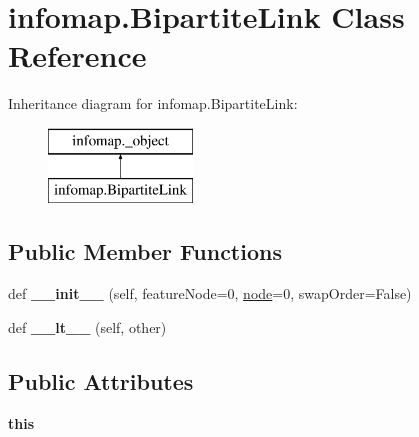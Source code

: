 \hypertarget{classinfomap_1_1BipartiteLink}{}\section{infomap.\+Bipartite\+Link Class Reference}
\label{classinfomap_1_1BipartiteLink}
Inheritance diagram for infomap.\+Bipartite\+Link\+:\begin{figure}[H]
\begin{center}
\leavevmode
\includegraphics[height=2.000000cm]{classinfomap_1_1BipartiteLink}
\end{center}
\end{figure}
\subsection*{Public Member Functions}
\begin{DoxyCompactItemize}
\item 
\mbox{\label{classinfomap_1_1BipartiteLink_a2b8a8dd8db074306c98379ef5d81345d}} 
def {\bfseries \+\_\+\+\_\+init\+\_\+\+\_\+} (self, feature\+Node=0, \mbox{\hyperlink{structnode}{node}}=0, swap\+Order=False)
\item 
\mbox{\label{classinfomap_1_1BipartiteLink_ac8e089d4ffda29d9246b72ad7b6da5c4}} 
def {\bfseries \+\_\+\+\_\+lt\+\_\+\+\_\+} (self, other)
\end{DoxyCompactItemize}
\subsection*{Public Attributes}
\begin{DoxyCompactItemize}
\item 
\mbox{\label{classinfomap_1_1BipartiteLink_a2cfffa034b9689639627728208313024}} 
{\bfseries this}
\end{DoxyCompactItemize}
